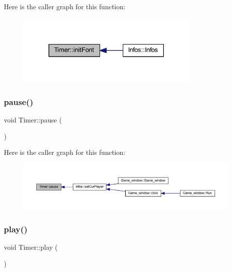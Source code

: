 Here is the caller graph for this function\+:\nopagebreak
\begin{figure}[H]
\begin{center}
\leavevmode
\includegraphics[width=258pt]{class_timer_aac2ddf298c3916e8839e827b387e6973_icgraph}
\end{center}
\end{figure}
\mbox{\label{class_timer_a0289effad7b573c508bc27e405900a23}} 
\subsubsection{\texorpdfstring{pause()}{pause()}}
{\footnotesize\ttfamily void Timer\+::pause (\begin{DoxyParamCaption}{ }\end{DoxyParamCaption})}

Here is the caller graph for this function\+:\nopagebreak
\begin{figure}[H]
\begin{center}
\leavevmode
\includegraphics[width=350pt]{class_timer_a0289effad7b573c508bc27e405900a23_icgraph}
\end{center}
\end{figure}
\mbox{\label{class_timer_a84acbe09a8dddae46c997c57a70c5076}} 
\subsubsection{\texorpdfstring{play()}{play()}}
{\footnotesize\ttfamily void Timer\+::play (\begin{DoxyParamCaption}{ }\end{DoxyParamCaption})}

